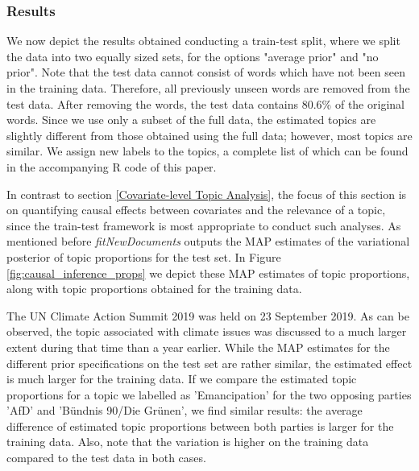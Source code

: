 \subsubsection{Results}
\label{Results}

We now depict the results obtained conducting a train-test split, where we split the data into two equally sized sets, for the options "average prior" and "no prior". Note that the test data cannot consist of words which have not been seen in the training data. Therefore, all previously unseen words are removed from the test data. After removing the words, the test data contains 80.6\% of the original words. Since we use only a subset of the full data, the estimated topics are slightly different from those obtained using the full data; however, most topics are similar. We assign new labels to the topics, a complete list of which can be found in the accompanying R code of this paper.

In contrast to section \ref{Covariate-level Topic Analysis}, the focus of this section is on quantifying causal effects between covariates and the relevance of a topic, since the train-test framework is most appropriate to conduct such analyses. As mentioned before \textit{fitNewDocuments} outputs the MAP estimates of the variational posterior of topic proportions for the test set. In Figure \ref{fig:causal_inference_props} we depict these MAP estimates of topic proportions, along with topic proportions obtained for the training data.

The UN Climate Action Summit 2019 was held on 23 September 2019. As can be observed, the topic associated with climate issues was discussed to a much larger extent during that time than a year earlier. While the MAP estimates for the different prior specifications on the test set are rather similar, the estimated effect is much larger for the training data. If we compare the estimated topic proportions for a topic we labelled as 'Emancipation' for the two opposing parties 'AfD' and 'B{\"u}ndnis 90/Die Gr{\"u}nen', we find similar results: the average difference of estimated topic proportions between both parties is larger for the training data. Also, note that the variation is higher on the training data compared to the test data in both cases.

